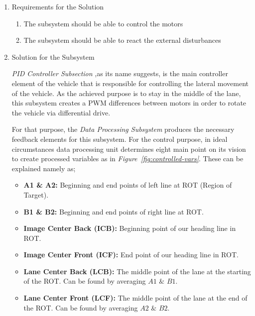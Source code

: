 \documentclass[a4paper,12pt]{article}
\begin{document}
			\begin{enumerate}
				\item {Requirements for the Solution}
			
				\begin{enumerate}
						\item The subsystem should be able to control the motors
						\item The subsystem should be able to react the external disturbances
					\end{enumerate} 
					
				\item {Solution for the Subsystem}
				
	\textit{PID Controller Subsection} ,as its name suggests, is the main controller element of the vehicle that is responsible for controlling the lateral movement of the vehicle. As the achieved purpose is to stay in the middle of the lane, this subsystem creates a PWM differences between motors in order to rotate the vehicle via differential drive. 
	
	For that purpose, the \textit{Data Processing Subsystem} produces the necessary feedback elements for this subsystem. For the control purpose, in ideal circumstances data processing unit determines eight main point on its vision to create processed variables as in \textit{Figure~\ref{fig:controlled-vars}}. These can be explained namely as;
	\begin{itemize}
		\item \textbf{A1 \& A2:} Beginning and end points of left line at ROT (Region of Target).
		\item \textbf{B1 \& B2:} Beginning and end points of right line at ROT.	
		\item \textbf{Image Center Back (ICB):} Beginning point of our heading line in ROT.
		\item \textbf{Image Center Front (ICF):} End point of our heading line in ROT.  
		\item \textbf{Lane Center Back (LCB):} The middle point of the lane at the starting of the ROT. Can be found by averaging $A1$ $\&$ $B1$.
		\item \textbf{Lane Center Front (LCF):} The middle point of the lane at the end of the ROT. Can be found by averaging $A2$ $\&$ $B2$.
	\end{itemize}	   
				
				
				
				
				

\end{enumerate}
\end{document}
